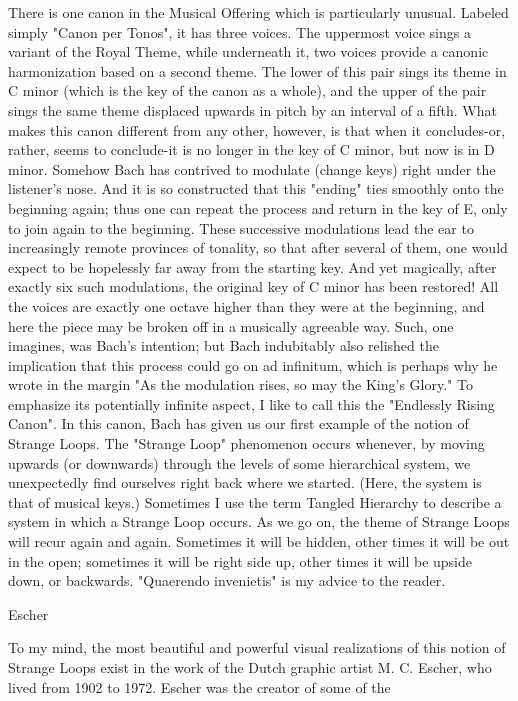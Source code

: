 There is one canon in the Musical Offering which is particularly unusual. Labeled simply
"Canon per Tonos", it has three voices. The uppermost voice sings a variant of the Royal
Theme, while underneath it, two voices provide a canonic harmonization based on a
second theme. The lower of this pair sings its theme in C minor (which is the key of the
canon as a whole), and the upper of the pair sings the same theme displaced upwards in
pitch by an interval of a fifth. What makes this canon different from any other, however,
is that when it concludes-or, rather, seems to conclude-it is no longer in the key of C
minor, but now is in D minor. Somehow Bach has contrived to modulate (change keys)
right under the listener's nose. And it is so constructed that this "ending" ties smoothly
onto the beginning again; thus one can repeat the process and return in the key of E, only
to join again to the beginning. These successive modulations lead the ear to increasingly
remote provinces of tonality, so that after several of them, one would expect to be
hopelessly far away from the starting key. And yet magically, after exactly six such
modulations, the original key of C minor has been restored! All the voices are exactly one
octave higher than they were at the beginning, and here the piece may be broken off in a
musically agreeable way. Such, one imagines, was Bach's intention; but Bach indubitably
also relished the implication that this process could go on ad infinitum, which is perhaps
why he wrote in the margin "As the modulation rises, so may the King's Glory." To
emphasize its potentially infinite aspect, I like to call this the "Endlessly Rising Canon".
   In this canon, Bach has given us our first example of the notion of Strange Loops. The
"Strange Loop" phenomenon occurs whenever, by moving upwards (or downwards)
through the levels of some hierarchical system, we unexpectedly find ourselves right
back where we started. (Here, the system is that of musical keys.) Sometimes I use the
term Tangled Hierarchy to describe a system in which a Strange Loop occurs. As we go
on, the theme of Strange Loops will recur again and again. Sometimes it will be hidden,
other times it will be out in the open; sometimes it will be right side up, other times it will
be upside down, or backwards. "Quaerendo invenietis" is my advice to the reader.


                                           Escher

To my mind, the most beautiful and powerful visual realizations of this notion of Strange
Loops exist in the work of the Dutch graphic artist M. C. Escher, who lived from 1902 to
1972. Escher was the creator of some of the




